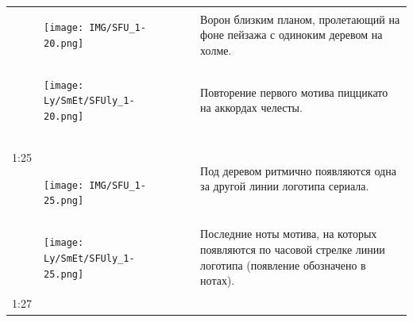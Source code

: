 \begin{longtable}[]{@{}ll@{}}
\begin{minipage}[t]{0.48\columnwidth}
\begin{figure}
\centering
\texttt{[image: IMG/SFU\_1-20.png]}
\caption{}
\end{figure}
\strut
\end{minipage} & \begin{minipage}[t]{0.48\columnwidth}\raggedright\strut
Ворон близким планом, пролетающий на фоне пейзажа
с одиноким деревом на холме.\strut
\end{minipage}\tabularnewline
\begin{minipage}[t]{0.32\columnwidth}\raggedright\strut
\begin{figure}
\centering
\texttt{[image: Ly/SmEt/SFUly\_1-20.png]}
\caption{}
\end{figure}
\strut
\end{minipage} & \begin{minipage}[t]{0.62\columnwidth}\raggedright\strut
Повторение первого мотива пиццикато
на аккордах челесты.\strut
\end{minipage}\tabularnewline
\begin{minipage}[t]{0.48\columnwidth}\raggedright\strut
1:25

\begin{figure}
\centering
\texttt{[image: IMG/SFU\_1-25.png]}
\caption{}
\end{figure}
\strut
\end{minipage} & \begin{minipage}[t]{0.48\columnwidth}\raggedright\strut
Под деревом ритмично появляются одна за другой
линии логотипа сериала.\strut
\end{minipage}\tabularnewline
\begin{minipage}[t]{0.32\columnwidth}\raggedright\strut
\begin{figure}
\centering
\texttt{[image: Ly/SmEt/SFUly\_1-25.png]}
\caption{}
\end{figure}
\strut
\end{minipage} & \begin{minipage}[t]{0.62\columnwidth}\raggedright\strut
Последние ноты мотива, на которых появляются по часовой
стрелке линии логотипа (появление обозначено в нотах).\strut
\end{minipage}\tabularnewline
\begin{minipage}[t]{0.48\columnwidth}\raggedright\strut
1:27


\end{minipage}
\end{longtable}
